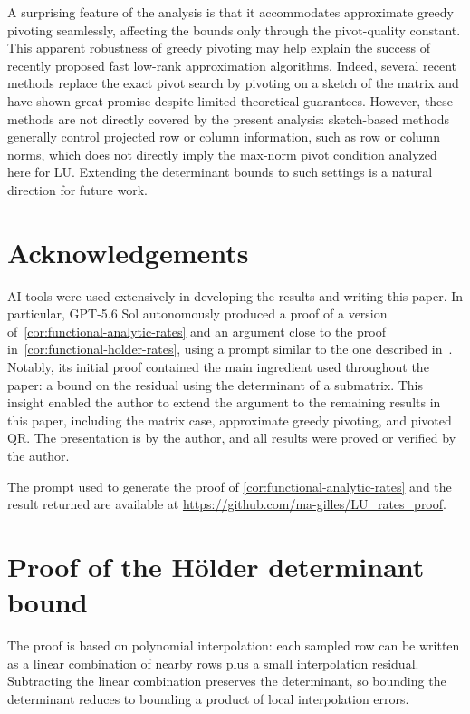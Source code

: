 \documentclass[11pt]{article}
\theoremstyle{definition}
\theoremstyle{remark}
\providecommand{\acknowledgement}[1]{\section*{Acknowledgements}#1}
\begin{document}
A surprising feature of the analysis is that it accommodates approximate
greedy pivoting seamlessly, affecting the bounds only through the
pivot-quality constant. This apparent robustness of greedy pivoting may help
explain the success of recently proposed fast low-rank approximation
algorithms. Indeed, several recent methods replace the exact pivot search by
pivoting on a sketch of the matrix
\cite{DongMartinsson2023,PearceEtAl2025,iterativeCUR,MelgaardGu2015}
and have shown great promise despite limited theoretical guarantees.
However, these methods are not directly covered by the present analysis:
sketch-based methods generally control projected row or column information,
such as row or column norms, which does not directly imply the max-norm pivot
condition analyzed here for LU. Extending the determinant bounds to such
settings is a natural direction for future work.

\acknowledgement{
AI tools were used extensively in developing the results and writing this
paper. In particular, GPT-5.6 Sol autonomously produced a proof of a version of~\cref{cor:functional-analytic-rates} and an argument
close to the proof in~\cref{cor:functional-holder-rates}, using a prompt similar to the one described in~\cite{Kerger2026}. Notably,
its initial proof contained the main ingredient used throughout the paper: a bound on the residual using the determinant of a submatrix. This insight enabled the author
to extend the argument to the remaining results in this paper, including
the matrix case, approximate greedy pivoting, and pivoted QR. The presentation is by the
author, and all results were proved or verified by the author.

The prompt used to generate the proof of \cref{cor:functional-analytic-rates} and the result returned
are available at \url{https://github.com/ma-gilles/LU_rates_proof}.
}

\appendix

\section{Proof of the H\"older determinant bound}
\label{sec:proof-differentiable-determinant}


The proof is based on polynomial interpolation: each sampled row can
be written as a linear combination of nearby rows plus a small interpolation
residual. Subtracting the linear combination preserves the determinant, so
bounding the determinant reduces to bounding a product of local
interpolation errors.
\end{document}
